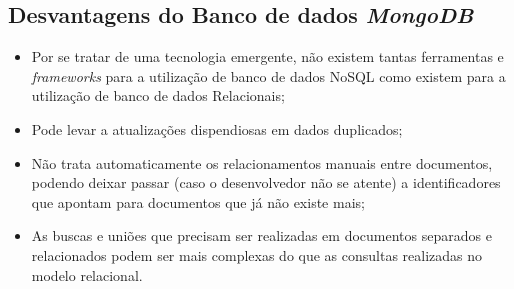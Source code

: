 \subsection{Desvantagens do Banco de dados \textit{MongoDB}}
    
\begin{itemize}
    \item Por se tratar de uma tecnologia emergente, não existem tantas ferramentas e \textit{frameworks} para a utilização de banco de dados NoSQL como existem para a utilização de banco de dados Relacionais;
    
    \item Pode levar a atualizações dispendiosas em dados duplicados;
    
    
    \item Não trata automaticamente os relacionamentos manuais entre documentos, podendo deixar passar (caso o desenvolvedor não se atente) a identificadores que apontam para documentos que já não existe mais;
    
    \item As buscas e uniões que precisam ser realizadas em documentos separados e relacionados podem ser mais complexas do que as consultas realizadas no modelo relacional.
\end{itemize}




